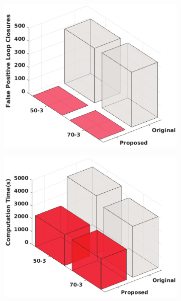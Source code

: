 \begin{figure}
	\begin{subfigure}[b]{.3\textwidth}
		\includegraphics[width=\textwidth]{Figure8_a.eps}
	\end{subfigure}
	\begin{subfigure}[b]{0.3\textwidth}
		\includegraphics[width=\textwidth]{Figure8_b.eps}

\end{subfigure}
\end{figure}
